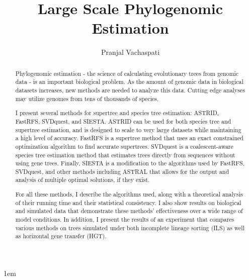 \documentclass[tocnosub,noragright,centerchapter,fullpagesingle,12pt]{uiuc_csthesis18}
\title{Large Scale Phylogenomic Estimation}
\author{Pranjal Vachaspati}
\begin{document}
\theoremstyle{definition}
\newtheorem{thm}{Theorem}[chapter]
\newtheorem{lemma}{Lemma}[chapter]
\newtheorem{theorem}[thm]{Theorem}
\newtheorem{definition}{Definition}[chapter]
\newtheorem{cor}{Corollary}[chapter]
\newtheorem{rem}{Remark}[chapter]
\newtheorem{remark}{Remark}[chapter]
\newtheorem{conj}{Conjecture}[chapter]
\newtheorem{observation}{Observation}[chapter]
\renewcommand{\qedsymbol}{QED.}


%

%
\maketitle

\parindent 1em%

\frontmatter

%
\begin{abstract}
Phylogenomic estimation - the science of calculating evolutionary trees from genomic data - is an important biological problem. As the amount of genomic data in biological datasets increases, new methods are needed to analyze this data. Cutting edge analyses may utilize genomes from tens of thousands of species.

I present several methods for supertree and species tree estimation: ASTRID, FastRFS, SVDquest, and SIESTA. ASTRID can be used for both species tree and supertree estimation, and is designed to scale to very large datasets while maintaining a high level of accuracy. FastRFS is a supertree method that uses an exact constrained optimization algorithm to find accurate supertrees. SVDquest is a coalescent-aware species tree estimation method that estimates trees directly from sequences without using gene trees. Finally, SIESTA is a modification to the algorithms used by FastRFS, SVDquest, and other methods including ASTRAL that allows for the output and analysis of multiple optimal solutions, if they exist. 

For all these methods, I describe the algorithms used, along with a theoretical analysis of their running time and their statistical consistency. I also show results on biological and simulated data that demonstrate these methods' effectiveness over a wide range of model conditions. In addition, I present the results of an experiment that compares various methods on trees simulated under both incomplete lineage sorting (ILS) as well as horizontal gene transfer (HGT).


\end{abstract}
\end{document}

